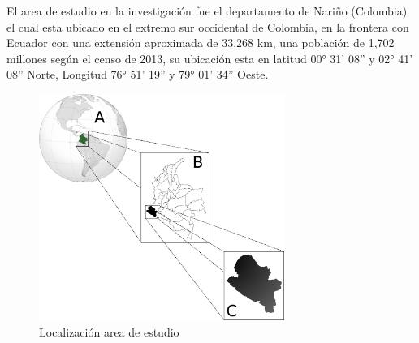 El area de estudio en la investigación fue el departamento de Nariño (Colombia)
el cual esta ubicado en el extremo sur occidental de Colombia, en la frontera con 
Ecuador con una extensión aproximada de 33.268 km, una población de 1,702 millones según
el censo de 2013, su ubicación 
esta en latitud 00° 31' 08'' y 02° 41' 08'' Norte, Longitud 76° 51' 19'' y 79° 01' 34'' Oeste.

\begin{figure}
  \centering
  \includegraphics[width = 8cm]{locationNarino.png}
  \caption{Localización area de estudio}
  \label{fig:locationNarino}
\end{figure}